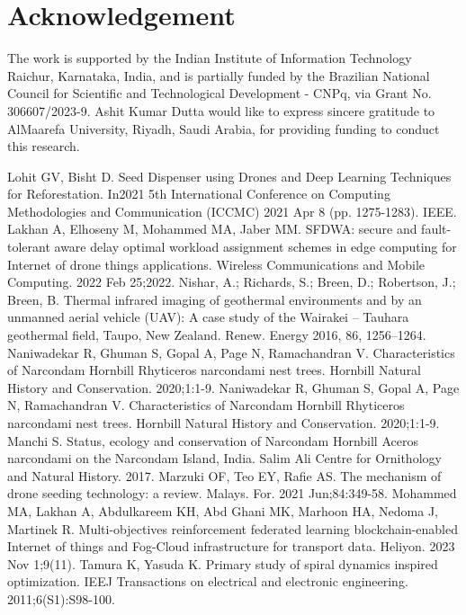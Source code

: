 \documentclass[conference]{IEEEtran}
\begin{document}
\section*{Acknowledgement} The work is supported by the Indian Institute of Information Technology Raichur, Karnataka, India, and is partially funded by the Brazilian National Council for Scientific and Technological Development - CNPq, via Grant No. 306607/2023-9. Ashit Kumar Dutta would like to express sincere gratitude to AlMaarefa University, Riyadh, Saudi Arabia, for providing funding to conduct this research.
\begin{thebibliography}{1}
 Lohit GV, Bisht D. Seed Dispenser using Drones and Deep Learning Techniques for Reforestation. In2021 5th International Conference on Computing Methodologies and Communication (ICCMC) 2021 Apr 8 (pp. 1275-1283). IEEE.
Lakhan A, Elhoseny M, Mohammed MA, Jaber MM. SFDWA: secure and fault-tolerant aware delay optimal workload assignment schemes in edge computing for Internet of drone things applications. Wireless Communications and Mobile Computing. 2022 Feb 25;2022.
 Nishar, A.; Richards, S.; Breen, D.; Robertson, J.; Breen, B. Thermal infrared imaging of geothermal environments and by an unmanned aerial vehicle (UAV): A case study of the Wairakei – Tauhara geothermal field, Taupo, New Zealand. Renew. Energy 2016, 86, 1256–1264.
 Naniwadekar R, Ghuman S, Gopal A, Page N, Ramachandran V. Characteristics of Narcondam Hornbill Rhyticeros narcondami nest trees. Hornbill Natural History and Conservation. 2020;1:1-9.
Naniwadekar R, Ghuman S, Gopal A, Page N, Ramachandran V. Characteristics of Narcondam Hornbill Rhyticeros narcondami nest trees. Hornbill Natural History and Conservation. 2020;1:1-9.
Manchi S. Status, ecology and conservation of Narcondam Hornbill Aceros narcondami on the Narcondam Island, India. Salim Ali Centre for Ornithology and Natural History. 2017.
Marzuki OF, Teo EY, Rafie AS. The mechanism of drone seeding technology: a review. Malays. For. 2021 Jun;84:349-58.
Mohammed MA, Lakhan A, Abdulkareem KH, Abd Ghani MK, Marhoon HA, Nedoma J, Martinek R. Multi-objectives reinforcement federated learning blockchain-enabled Internet of things and Fog-Cloud infrastructure for transport data. Heliyon. 2023 Nov 1;9(11).
 Tamura K, Yasuda K. Primary study of spiral dynamics inspired optimization. IEEJ Transactions on electrical and electronic engineering. 2011;6(S1):S98-100.
\end{thebibliography}
\end{document}
